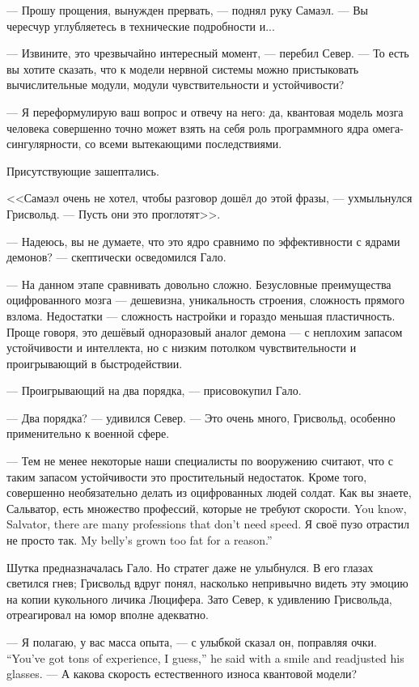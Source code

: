 --- Прошу прощения, вынужден прервать, --- поднял руку Самаэл.
--- Вы чересчур углубляетесь в технические подробности и...

--- Извините, это чрезвычайно интересный момент, --- перебил Север.
--- То есть вы хотите сказать, что к модели нервной системы можно пристыковать вычислительные модули, модули чувствительности и устойчивости?

--- Я переформулирую ваш вопрос и отвечу на него: да, квантовая модель мозга человека совершенно точно может взять на себя роль программного ядра омега-сингулярности, со всеми вытекающими последствиями.

Присутствующие зашептались.

<<Самаэл очень не хотел, чтобы разговор дошёл до этой фразы, --- ухмыльнулся Грисвольд.
--- Пусть они это проглотят>>.

--- Надеюсь, вы не думаете, что это ядро сравнимо по эффективности с ядрами демонов? --- скептически осведомился Гало.

--- На данном этапе сравнивать довольно сложно.
Безусловные преимущества оцифрованного мозга --- дешевизна, уникальность строения, сложность прямого взлома.
Недостатки --- сложность настройки и гораздо меньшая пластичность.
Проще говоря, это дешёвый одноразовый аналог демона --- с неплохим запасом устойчивости и интеллекта, но с низким потолком чувствительности и проигрывающий в быстродействии.

--- Проигрывающий на два порядка, --- присовокупил Гало.

--- Два порядка? --- удивился Север.
--- Это очень много, Грисвольд, особенно применительно к военной сфере.

--- Тем не менее некоторые наши специалисты по вооружению считают, что с таким запасом устойчивости это простительный недостаток.
Кроме того, совершенно необязательно делать из оцифрованных людей солдат.
{Как вы знаете, Сальватор, есть множество профессий, которые не требуют скорости.}
{You know, Salvator, there are many professions that don't need speed.}
{Я своё пузо отрастил не просто так.}
{My belly's grown too fat for a reason.''}

Шутка предназначалась Гало.
Но стратег даже не улыбнулся.
В его глазах светился гнев;
Грисвольд вдруг понял, насколько непривычно видеть эту эмоцию на копии кукольного личика Люцифера.
Зато Север, к удивлению Грисвольда, отреагировал на юмор вполне адекватно.

{--- Я полагаю, у вас масса опыта, --- с улыбкой сказал он, поправляя очки.}
{``You've got tons of experience, I guess,'' he said with a smile and readjusted his glasses.}
--- А какова скорость естественного износа квантовой модели?

